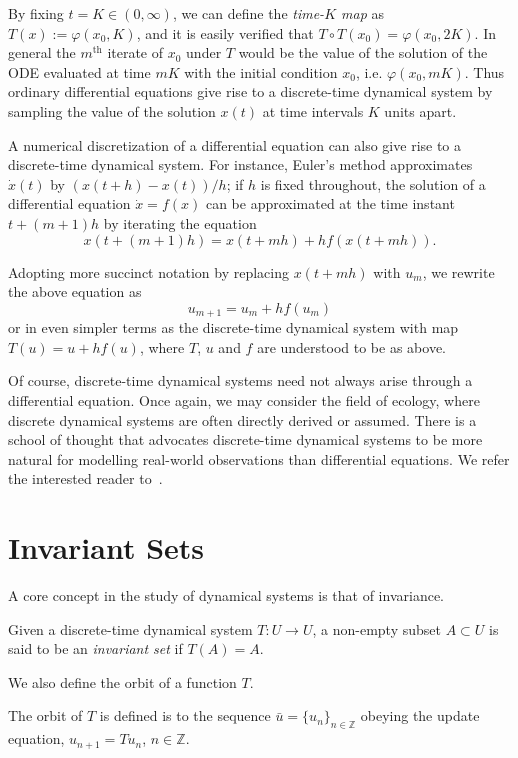 By fixing $t=K \in (0,\infty)$, we can define the \emph{time-$K$ map} as  $T(x):= \varphi(x_0,K)$, and it is easily verified that $T\circ T(x_0) = \varphi(x_0,2K)$. In general the $m^{\mbox{th}}$ iterate of $x_0$ under $T$ would be the value of the solution of the ODE evaluated at time $mK$ with the initial condition $x_0$, i.e. $\varphi(x_0, mK)$. 
Thus ordinary differential equations give rise to a discrete-time dynamical system by sampling the value of the solution $x(t)$ at time intervals $K$ units apart. 


A numerical discretization of a differential equation can also give rise to a discrete-time dynamical system. For instance, Euler's method approximates $\dot{x}(t)$ by $(x(t+h)-x(t))/h$; if $h$ is fixed throughout, the solution of a differential equation $\dot{x}=f(x)$ 
can be approximated at the time instant $t+(m+1)h$ by iterating the equation 
\begin{equation}
  x(t+(m+1)h) = x(t+mh) + h f(x(t+mh)).
\end{equation}

Adopting more succinct notation by replacing $x(t+mh)$ with $u_m$, we rewrite the above equation as
\begin{equation}
u_{m+1} = u_m + hf(u_m)
\end{equation}
or in even simpler terms as the discrete-time dynamical system with map $T(u) = u + hf(u)$, where $T$, $u$ and $f$ are understood to be as above.


Of course, discrete-time dynamical systems need not always arise through a differential equation. Once again, we may consider the field of ecology, where discrete dynamical systems are often directly derived or assumed. 
There is a school of thought that advocates discrete-time dynamical systems to be more natural for modelling real-world observations than differential equations. We refer the interested reader to~\cite{saber2010introduction}.


\section{Invariant Sets}

A core concept in the study of dynamical systems is that of invariance. 
\begin{Definition}
  \label{Dfn_InvariantSet}\rm
  Given a discrete-time dynamical system $T: U \to U$, a non-empty subset $A \subset U$ is said to be an \emph{invariant set} if $T(A) =A$. 
\end{Definition}
We also define the orbit of a function $T$.
\begin{Definition}
  [\bf Orbit of $T$]\label{Dfn_Orbit}\rm
  The orbit of $T$ is defined  is to the sequence $\bar{u} = {\{u_n\}}_{n\in \mathbb{Z}}$ obeying the update equation, $u_{n+1}=Tu_n$, $n \in \mathbb{Z}$. 
\end{Definition}

